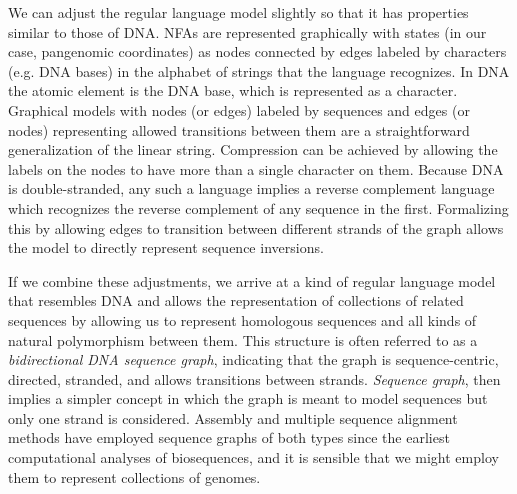 \documentclass[a4paper,12pt,numbered,oneside]{Classes/PhDThesisPSnPDF}
\begin{document}
We can adjust the regular language model slightly so that it has properties similar to those of DNA.
NFAs are represented graphically with states (in our case, pangenomic coordinates) as nodes connected by edges labeled by characters (e.g. DNA bases) in the alphabet of strings that the language recognizes.
In DNA the atomic element is the DNA base, which is represented as a character.
Graphical models with nodes (or edges) labeled by sequences and edges (or nodes) representing allowed transitions between them are a straightforward generalization of the linear string.
Compression can be achieved by allowing the labels on the nodes to have more than a single character on them.
Because DNA is double-stranded, any such a language implies a reverse complement language which recognizes the reverse complement of any sequence in the first.
Formalizing this by allowing edges to transition between different strands of the graph allows the model to directly represent sequence inversions.

If we combine these adjustments, we arrive at a kind of regular language model that resembles DNA and allows the representation of collections of related sequences by allowing us to represent homologous sequences and all kinds of natural polymorphism between them.
This structure is often referred to as a \emph{bidirectional DNA sequence graph}, indicating that the graph is sequence-centric, directed, stranded, and allows transitions between strands.
\emph{Sequence graph}, then implies a simpler concept in which the graph is meant to model sequences but only one strand is considered.
Assembly and multiple sequence alignment methods have employed sequence graphs of both types since the earliest computational analyses of biosequences, and it is sensible that we might employ them to represent collections of genomes.
\end{document}
